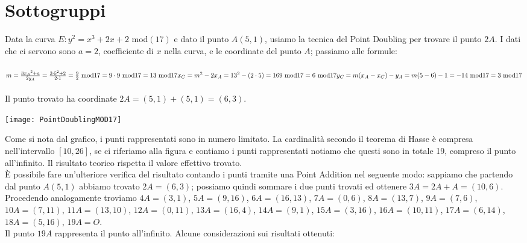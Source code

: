 \documentclass[a4paper,12pt]{tesiinfo}
\begin{document}
\chapter{Sottogruppi}
%
Data la curva $E: y^2 = x^3 +2x +2$ mod$(17)$ e dato il punto $A(5, 1)$, usiamo la tecnica del Point Doubling per trovare il punto $2A$.
I dati che ci servono sono $a = 2$, coefficiente di $x$ nella curva, e le coordinate del punto $A$; passiamo alle formule:
\\
\\
$m = \frac{3{x_A}^2 + a}{2y_A}= \frac{3 \cdot 5^2 + 2}{2 \cdot 1} = \frac{9}{2} \text{ mod}17= 9 \cdot 9 \text{ mod}17 = 13\text{ mod}17\\
x_C = m^2 - 2x_A= 13^2 - (2 \cdot 5) = 169\text{ mod}17 = 6 \text{ mod}17\\
y_C = m(x_A - x_C)-y_A= m(5 - 6)-1 = -14\text{ mod}17 = 3\text{ mod}17
$
\\
\\
Il punto trovato ha coordinate $2A = (5, 1)+(5, 1) = (6, 3)$.
\\
\begin{center}
\texttt{[image: PointDoublingMOD17]}
\end{center}
Come si nota dal grafico, i punti rappresentati sono in numero limitato. La cardinalit\`a secondo il teorema di Hasse \`e compresa nell'intervallo $[10, 26]$, se ci riferiamo alla figura e contiamo i punti rappresentati notiamo che questi sono in totale 19, compreso il punto all'infinito. Il risultato teorico rispetta il valore effettivo trovato.
\\
\`E possibile fare un'ulteriore verifica del risultato contando i punti tramite una Point Addition nel seguente modo: sappiamo che partendo dal punto $A(5, 1)$ abbiamo trovato $2A = (6, 3)$; possiamo quindi sommare i due punti trovati ed ottenere $3A = 2A + A = (10, 6)$. Procedendo analogamente troviamo $4A = (3, 1)$, $5A = (9, 16)$, $6A = (16, 13)$, $7A = (0, 6)$, $8A = (13, 7)$, $9A = (7, 6)$, $10A = (7, 11)$, $11A = (13, 10)$, $12A = (0, 11)$, $13A = (16, 4)$,  $14A = (9, 1)$, $15A = (3, 16)$, $16A = (10, 11)$, $17A = (6, 14)$, $18A = (5, 16)$, $19A = O$.
\\
Il punto $19A$ rappresenta il punto all'infinito.
Alcune considerazioni sui risultati ottenuti:
\end{document}
